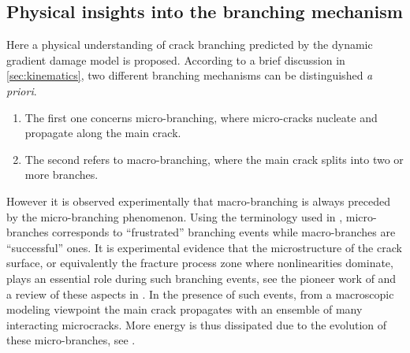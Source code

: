 \subsection{Physical insights into the branching mechanism} \label{sec:microbrachingstu}
Here a physical understanding of crack branching predicted by the dynamic gradient damage model is proposed. According to a brief discussion in \cref{sec:kinematics}, two different branching mechanisms can be distinguished \emph{a priori}.
\begin{enumerate}
\item The first one concerns micro-branching, where micro-cracks nucleate and propagate along the main crack.
\item The second refers to macro-branching, where the main crack splits into two or more branches.
\end{enumerate}
However it is observed experimentally that macro-branching is always preceded by the micro-branching phenomenon. Using the terminology used in \cite{SharonFineberg:1996}, micro-branches corresponds to ``frustrated'' branching events while macro-branches are ``successful'' ones. It is experimental evidence that the microstructure of the crack surface, or equivalently the fracture process zone where nonlinearities dominate, plays an essential role during such branching events, see the pioneer work of \cite{Ravi-ChandarKnauss:1984,Ravi-ChandarKnauss:1984a} and a review of these aspects in \cite{FinebergMarder:1999}. In the presence of such events, from a macroscopic modeling viewpoint the main crack propagates with an ensemble of many interacting microcracks. More energy is thus dissipated due to the evolution of these micro-branches, see \cite{SharonGrossFineberg:1996}.

